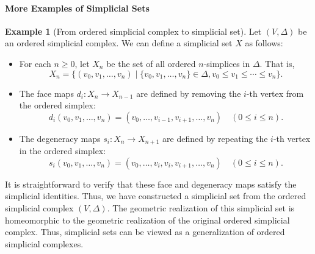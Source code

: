 \documentclass[11pt]{article}
\theoremstyle{definition}
\newtheorem{example}[definition]{Example}
\theoremstyle{plain}
\begin{document}
\paragraph{More Examples of Simplicial Sets}



\begin{example}[From ordered simplicial complex to simplicial set]
    Let $(V, \Delta)$ be an ordered simplicial complex. We can define a simplicial set $X$ as follows:
    \begin{itemize}
        \item For each $n \geq 0$, let $X_n$ be the set of all ordered $n$-simplices in $\Delta$. That is,
              \[
                  X_n = \{ (v_0, v_1, \ldots, v_n) \mid \{v_0, v_1, \ldots, v_n\} \in \Delta, v_0 \leq v_1 \leq \cdots \leq v_n \}.
              \]
        \item The face maps $d_i : X_n \to X_{n-1}$ are defined by removing the $i$-th vertex from the ordered simplex:
              \[
                  d_i(v_0, v_1, \ldots, v_n) = (v_0, \ldots, v_{i-1}, v_{i+1}, \ldots, v_n) \quad (0 \leq i \leq n).
              \]
        \item The degeneracy maps $s_i : X_n \to X_{n+1}$ are defined by repeating the $i$-th vertex in the ordered simplex:
              \[
                  s_i(v_0, v_1, \ldots, v_n) = (v_0, \ldots, v_i, v_i, v_{i+1}, \ldots, v_n) \quad (0 \leq i \leq n).
              \]
    \end{itemize}
    It is straightforward to verify that these face and degeneracy maps satisfy the simplicial identities. Thus, we have constructed a simplicial set from the ordered simplicial complex $(V, \Delta)$.
    The geometric realization of this simplicial set is homeomorphic to the geometric realization of the original ordered simplicial complex. Thus, simplicial sets can be viewed as a generalization of ordered simplicial complexes.
\end{example}
\end{document}
